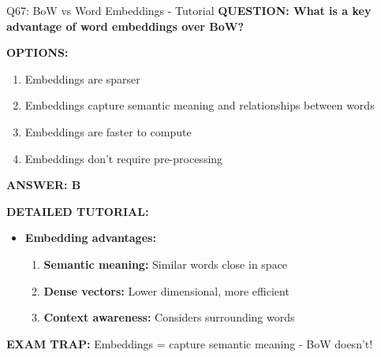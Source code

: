 \documentclass[8pt]{beamer}
\begin{document}
	\begin{frame}{Q67: BoW vs Word Embeddings - Tutorial}
		\fontsize{6.5}{7.5}\selectfont
		\textbf{QUESTION: What is a key advantage of word embeddings over BoW?}
		
		\vspace{0.1cm}
		\textbf{OPTIONS:}
		\begin{enumerate}
			\item Embeddings are sparser
			\item Embeddings capture semantic meaning and relationships between words
			\item Embeddings are faster to compute
			\item Embeddings don't require pre-processing
		\end{enumerate}
		
		\vspace{0.1cm}
		\textcolor{myblue}{\textbf{ANSWER: B}}
		
		\vspace{0.1cm}
		\textbf{DETAILED TUTORIAL:}
		\begin{itemize}
			\item \textbf{Embedding advantages:}
			\begin{enumerate}
				\item \textbf{Semantic meaning:} Similar words close in space
				\item \textbf{Dense vectors:} Lower dimensional, more efficient
				\item \textbf{Context awareness:} Considers surrounding words
			\end{enumerate}
		\end{itemize}
		
		\textcolor{myred}{\textbf{EXAM TRAP:}} Embeddings = \textcolor{myblue}{capture semantic meaning} - BoW doesn't!
	\end{frame}
	
\end{document}

